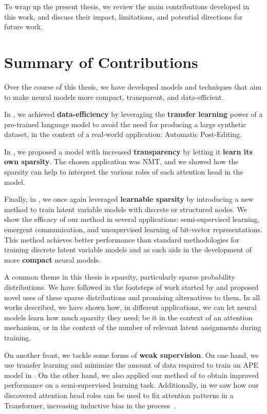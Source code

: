 \label{chap:conclusions}

\cleardoublepage
\onehalfspacing

To wrap up the present thesis, we review the main contributions
developed in this work, and discuss their impact, limitations, and
potential directions for future work.

\section{Summary of Contributions}

Over the course of this thesis, we have developed models and
techniques that aim to make neural models more compact, transparent,
and data-efficient.

In , we achieved \textbf{data-efficiency} by
leveraging the \textbf{transfer learning} power of a pre-trained
language model to avoid the need for producing a large synthetic
dataset, in the context of a real-world application: Automatic
Post-Editing.

In , we proposed a model with increased
\textbf{transparency} by letting it \textbf{learn its own sparsity}.
The chosen application was NMT, and we showed
how the sparsity can help to interpret the various roles of each
attention head in the model.

Finally, in , we once again leveraged
\textbf{learnable sparsity} by introducing a new method to train
latent variable models with discrete or structured nodes. We show the
efficacy of our method in several applications: semi-supervised
learning, emergent communication, and unsupervised learning of
bit-vector representations. This method achieves better performance
than standard methodologies for training discrete latent variable
models and as such aids in the development of more \textbf{compact}
neural models.

A common theme in this thesis is sparsity, particularly
sparse probability distributions. We have followed in the footsteps
of work started by \citet{sparsemax} and proposed novel uses of
these sparse distributions and promising alternatives to them.
In all works described, we have shown how, in different applications,
we can let neural models learn how much sparsity they need; be it
in the context of an attention mechanism, or in the context of
the number of relevant latent assignments during training.

On another front, we tackle some forms of \textbf{weak supervision}.
On one hand, we use transfer learning and minimize the amount of data
required to train an APE model in . On the other
hand, we also applied our method of  to
obtain improved performance on a semi-supervised learning task.
Additionally, in  we saw how our
discovered attention head roles can be used to fix attention patterns
in a Transformer, increasing inductive bias in the
process~\citep{raganato2020FixedEncoderSelfAttentiona}.

